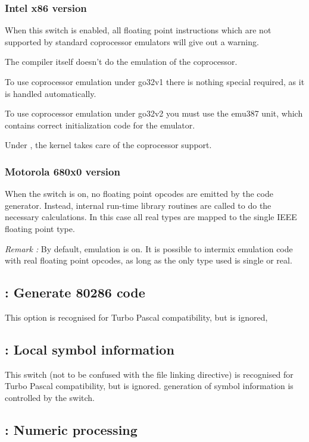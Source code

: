 \documentclass{report}
\begin{document}
\subsubsection{ Intel x86 version }

When this switch is enabled, all floating point instructions
which are not supported by standard coprocessor emulators will give out
a warning.

The compiler itself doesn't do the emulation of the coprocessor.

To use coprocessor emulation under \dos go32v1 there is nothing special
required, as it is handled automatically.

To use coprocessor emulation under \dos go32v2 you must use the
emu387 unit, which contains correct initialization code for the
emulator.

Under \linux, the kernel takes care of the coprocessor support.

\subsubsection{ Motorola 680x0 version }

When the switch is on, no floating point opcodes are emitted
by the code generator. Instead, internal run-time library routines
are called to do the necessary calculations. In this case all
real types are mapped to the single IEEE floating point type.

\emph{ Remark : } By default, emulation is on. It is possible to
intermix emulation code with real floating point opcodes, as
long as the only type used is single or real.


\subsection{ : Generate 80286 code}

This option is recognised for Turbo Pascal compatibility, but is ignored,

\subsection{ : Local symbol information}

This switch (not to be confused with the  file linking
directive) is recognised for Turbo Pascal compatibility, but is ignored.
generation of symbol information is controlled by the  switch.

\subsection{ : Numeric processing }
\end{document}
